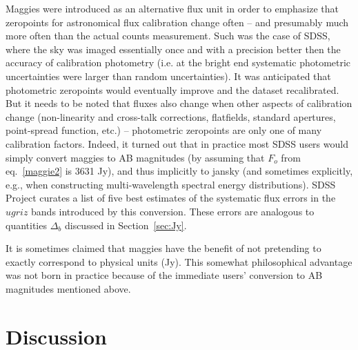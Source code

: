 \documentclass[DM,lsstdraft,toc,usenatbib]{lsstdoc}
\begin{document}
Maggies were introduced as an alternative flux unit in order to emphasize
that zeropoints for astronomical flux calibration change often -- and 
presumably much more often than the actual counts measurement. Such 
was the case of SDSS, where the sky was imaged essentially once and with
a precision better then the accuracy of calibration photometry (i.e. at 
the bright end systematic photometric uncertainties were larger than 
random uncertainties). It was anticipated that photometric zeropoints 
would eventually improve and the dataset recalibrated.  But it needs to 
be noted that fluxes also change when other aspects of calibration change
(non-linearity and cross-talk corrections, flatfields, standard apertures, 
point-spread function, etc.) -- photometric zeropoints are only one of 
many calibration factors. Indeed, it turned out that in practice most 
SDSS users would simply convert maggies to AB magnitudes (by assuming
that $F_o$ from eq.~\ref{maggie2} is 3631 Jy), and thus
implicitly to jansky (and sometimes explicitly, e.g., when constructing
multi-wavelength spectral energy distributions). SDSS Project curates a 
list of five best estimates of the systematic flux errors in the $ugriz$ 
bands introduced by this conversion. These errors are analogous to 
quantities $\Delta_b$ discussed in Section~\ref{sec:Jy}. 
 
It is sometimes claimed that maggies have the benefit of not pretending 
to exactly correspond to physical units (Jy). This somewhat philosophical
advantage was not born in practice because of the immediate users' 
conversion to AB magnitudes mentioned above. 


\section{Discussion} 
\end{document}
